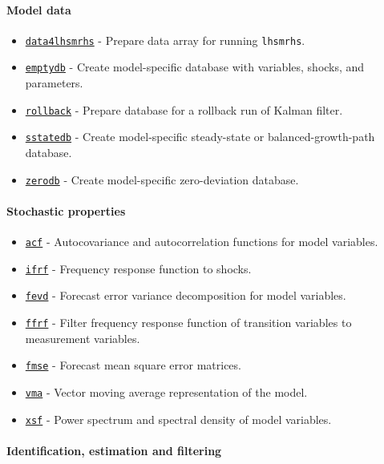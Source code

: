 \paragraph{Model data}

\begin{itemize}
\itemsep1pt\parskip0pt
\item
  \href{model/data4lhsmrhs}{\texttt{data4lhsmrhs}} - Prepare data array
  for running \texttt{lhsmrhs}.
\item
  \href{model/emptydb}{\texttt{emptydb}} - Create model-specific
  database with variables, shocks, and parameters.
\item
  \href{model/rollback}{\texttt{rollback}} - Prepare database for a
  rollback run of Kalman filter.
\item
  \href{model/sstatedb}{\texttt{sstatedb}} - Create model-specific
  steady-state or balanced-growth-path database.
\item
  \href{model/zerodb}{\texttt{zerodb}} - Create model-specific
  zero-deviation database.
\end{itemize}

\paragraph{Stochastic properties}

\begin{itemize}
\itemsep1pt\parskip0pt
\item
  \href{model/acf}{\texttt{acf}} - Autocovariance and autocorrelation
  functions for model variables.
\item
  \href{model/ifrf}{\texttt{ifrf}} - Frequency response function to
  shocks.
\item
  \href{model/fevd}{\texttt{fevd}} - Forecast error variance
  decomposition for model variables.
\item
  \href{model/ffrf}{\texttt{ffrf}} - Filter frequency response function
  of transition variables to measurement variables.
\item
  \href{model/fmse}{\texttt{fmse}} - Forecast mean square error
  matrices.
\item
  \href{model/vma}{\texttt{vma}} - Vector moving average representation
  of the model.
\item
  \href{model/xsf}{\texttt{xsf}} - Power spectrum and spectral density
  of model variables.
\end{itemize}

\paragraph{Identification, estimation and
filtering}

